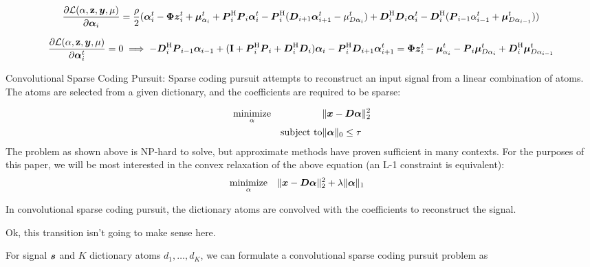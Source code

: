 \documentclass{article}
\begin{document}
\begin{equation}
\frac{\partial \mathcal{L}(\mathbf{\alpha},\mathbf{z},\boldsymbol{y},\mathbf{\mu})}{\partial \boldsymbol{\alpha}_i} = \frac{\rho}{2}(\boldsymbol{\alpha}_i^t - \boldsymbol{\Phi}\boldsymbol{z}_i^t + \boldsymbol{\mu}_{\alpha_i}^t + \boldsymbol{P}_i^{\mathrm{H}}\boldsymbol{P}_i\boldsymbol{\alpha}_i^t - \boldsymbol{P}_i^{\mathrm{H}}(\boldsymbol{D}_{i + 1}\boldsymbol{\alpha}_{i + 1}^t - \mu_{D\alpha_i}^t) + \boldsymbol{D}_{i}^{\mathrm{H}}\boldsymbol{D}_{i}\boldsymbol{\alpha}_{i}^t - \boldsymbol{D}_i^{\mathrm{H}}(\boldsymbol{P}_{i - 1}\alpha_{i - 1}^t + \boldsymbol{\mu}_{D\alpha_{i - 1}}^t))
\end{equation}

\begin{equation}
\frac{\partial \mathcal{L}(\mathbf{\alpha},\mathbf{z},\boldsymbol{y},\mathbf{\mu})}{\partial \boldsymbol{\alpha}_i^t} = 0 \implies
-\boldsymbol{D}_i^{\mathrm{H}}\boldsymbol{P}_{i - 1}\boldsymbol{\alpha}_{i - 1}
+ ({\bf I} + \boldsymbol{P}_i^{\mathrm{H}}\boldsymbol{P}_i + \boldsymbol{D}_i^{\mathrm{H}}\boldsymbol{D}_i)\boldsymbol{\alpha}_i
- \boldsymbol{P}_i^{\mathrm{H}}\boldsymbol{D}_{i + 1}\boldsymbol{\alpha}_{i + 1}^t
=
\boldsymbol{\Phi}\boldsymbol{z}_i^t - \boldsymbol{\mu}_{\alpha_i}^t 
- \boldsymbol{P}_i\boldsymbol{\mu}_{D\alpha_i}^t 
+ \boldsymbol{D}_i^{\mathrm{H}}\boldsymbol{\mu}_{D\alpha_{i - 1}}^t
\end{equation}



Convolutional Sparse Coding Pursuit:
Sparse coding pursuit attempts to reconstruct an input signal from a linear combination of atoms. The atoms are selected from a given dictionary, and the coefficients are required to be sparse:

\begin{align}
& \operatorname*{\text{minimize}}_{\alpha} && \|\boldsymbol{x} - \boldsymbol{D}\boldsymbol{\alpha}\|_2^2\\
&& \text{subject to} & \|\boldsymbol{\alpha}\|_0 \leq \tau
\end{align}
The problem as shown above is NP-hard to solve, but approximate methods have proven sufficient in many contexts.  For the purposes of this paper, we will be most interested in the convex relaxation of the above equation (an L-1 constraint is equivalent):
\begin{align}
& \operatorname*{\text{minimize}}_{\alpha} && \|\boldsymbol{x} - \boldsymbol{D}\boldsymbol{\alpha}\|_2^2 + \lambda \|\boldsymbol{\alpha}\|_1
\end{align}

In convolutional sparse coding pursuit, the dictionary atoms are convolved with the coefficients to reconstruct the signal.

Ok, this transition isn't going to make sense here.


For signal $\boldsymbol{s}$ and $K$ dictionary atoms $d_1, \hdots,d_K$, we can formulate a convolutional sparse coding pursuit problem as
\end{document}
